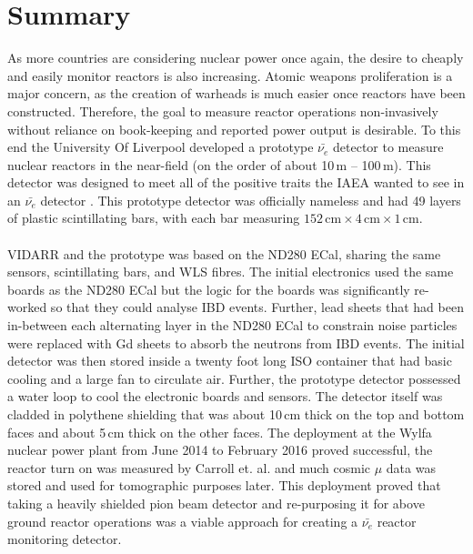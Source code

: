 
\chapter{Summary}

\ifpdf
    \graphicspath{{Chapter7/Figs/Raster/}{Chapter6/Figs/PDF/}{Chapter6/Figs/}}
\else
    \graphicspath{{Chapter7/Figs/Vector/}{Chapter7/Figs/}}
\fi

As more countries are considering nuclear power once again, the desire to cheaply and easily monitor reactors is also increasing. Atomic weapons proliferation is a major concern, as the creation of warheads is much easier once reactors have been constructed. Therefore, the goal to measure reactor operations non-invasively without reliance on book-keeping and reported power output is desirable. To this end the University Of Liverpool developed a prototype $\bar{\nu_e}$ detector to measure nuclear reactors in the near-field (on the order of about 10\,m -- 100\,m). This detector was designed to meet all of the positive traits the IAEA wanted to see in an $\bar{\nu_e}$ detector \cite{IAEA_2008}. This prototype detector was officially nameless and had 49 layers of plastic scintillating bars, with each bar measuring $152\,\textrm{cm} \times 4\,\textrm{cm} \times 1\,\textrm{cm}$.
\\\\VIDARR and the prototype was based on the ND280 ECal, sharing the same sensors, scintillating bars, and WLS fibres. The initial electronics used the same boards as the ND280 ECal but the logic for the boards was significantly re-worked so that they could analyse IBD events. Further, lead sheets that had been in-between each alternating layer in the ND280 ECal to constrain noise particles were replaced with Gd sheets to absorb the neutrons from IBD events. The initial detector was then stored inside a twenty foot long ISO container that had basic cooling and a large fan to circulate air. Further, the prototype detector possessed a water loop to cool the electronic boards and sensors. The detector itself was cladded in polythene shielding that was about 10\,cm thick on the top and bottom faces and about 5\,cm thick on the other faces. The deployment at the Wylfa nuclear power plant from June 2014 to February 2016 proved successful, the reactor turn on was measured by Carroll et. al. \cite{Carroll_2018} and much cosmic $\mu$ data was stored and used for tomographic purposes later. This deployment proved that taking a heavily shielded pion beam detector and re-purposing it for above ground reactor operations was a viable approach for creating a $\bar{\nu_e}$ reactor monitoring detector. 

